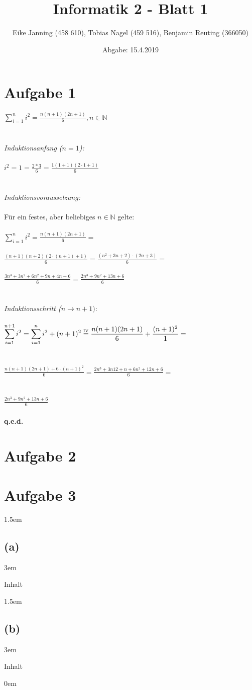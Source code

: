 \documentclass[11pt]{article}
\title{Informatik 2 - Blatt 1}
\author{Eike Janning (458 610), Tobias Nagel (459 516), Benjamin Reuting (366050)}
\date{Abgabe: 15.4.2019}
\begin{document}
\maketitle

\section*{Aufgabe 1}

$\displaystyle\sum_{i=1}^{n} i^2 = \frac{n(n+1)(2n+1)}{6}, n\in\mathbb{N}$
\\\\\\
\textit{Induktionsanfang ($n=1$):}\\\\
$i^2 = 1 = \frac{2*3}{6} = \frac{1(1+1)(2\cdot1+1)}{6}$
\\\\\\
\textit{Induktionsvoraussetzung:}\\\\
Für ein festes, aber beliebiges $n\in\mathbb{N}$ gelte:\\\\
$\displaystyle\sum_{i=1}^{n} i^2 = \frac{n(n+1)(2n+1)}{6} = $\\\\
$\displaystyle\frac{(n+1)(n+2)(2 \cdot (n+1)+1)}{6} = \frac{(n^2+3n+2) \cdot (2n+3)}{6} = $\\\\
$\displaystyle\frac{3n^3+3n^2+6n^2+9n+4n+6}{6} = \frac{2n^3+9n^2+13n+6}{6}$
\\\\\\
\textit{Induktionsschritt ($n \to n+1):$}\\\\
$\displaystyle\sum_{i=1}^{n+1} i^2 = \displaystyle\sum_{i=1}^{n} i^2 + (n+1)^2 \overset{\text{\tiny{IV}}}{=} \frac{n(n+1)(2n+1)}{6} + \frac{(n+1)^2}{1} = $\\\\\\
$\displaystyle\frac{n(n+1)(2n+1) + 6 \cdot (n+1)^2}{6} = \frac{2n^3+3n12+n+6n^2+12n+6}{6} = $\\\\\\
$\displaystyle\frac{2n^3+9n^2+13n+6}{6}$\\\\
\textbf{q.e.d.}

\pagebreak

\section*{Aufgabe 2}

\pagebreak

\section*{Aufgabe 3}

\leftskip 1.5em
\subsection*{(a)}
\leftskip 3em

Inhalt

\leftskip 1.5em
\subsection*{(b)}
\leftskip 3em

Inhalt

\leftskip 0em
\end{document}
